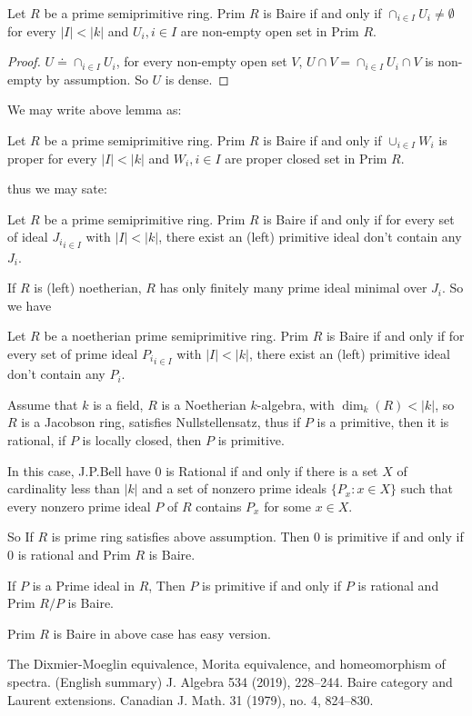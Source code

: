 \documentclass[12pt]{amsart}
\newcommand{\Prim}{ \text{Prim } }
\theoremstyle{plain}
\numberwithin{thm}{section}
\theoremstyle{definition}
\begin{document}
\lemma Let $R$ be a prime semiprimitive ring. $\Prim R$ is Baire if and only if $\cap_{i \in I} U_i \neq \emptyset$ for every $|I| < |k|$ and $U_i, i \in I$ are non-empty open set in $\Prim R$.

\begin{proof}
$U \doteq \cap_{i \in I} U_i$, for every non-empty open set $V$, $U \cap V = \cap_{i \in I}  {U_i} \cap V$ is non-empty by assumption. So $U$ is dense.
\end{proof}

We may write above lemma as:

\lemma Let $R$ be a prime semiprimitive ring. $\Prim R$ is Baire if and only if $\cup_{i \in I} W_i$ is proper for every $|I| < |k|$ and $W_i, i \in I$ are proper closed set in $\Prim R$.

thus we may sate:

\lemma Let $R$ be a prime semiprimitive ring. $\Prim R$ is Baire if and only if for every set of ideal ${J_i}_{i \in I}$ with $|I| < |k|$, there exist an (left) primitive ideal don't contain any $J_i$.

If $R$ is (left) noetherian, $R$ has only finitely many prime ideal minimal over $J_i$. So we have

\lemma Let $R$ be a noetherian prime semiprimitive ring. $\Prim R$ is Baire if and only if for every set of prime ideal ${P_i}_{i \in I}$ with $|I| < |k|$, there exist an (left) primitive ideal don't contain any $P_i$.

Assume that $k$ is a field, $R$ is a Noetherian $k$-algebra, with $\dim_k(R) < |k|$, so $R$ is a Jacobson ring, satisfies Nullstellensatz, thus if $P$ is a primitive, then it is rational, if $P$ is locally closed, then $P$ is primitive.

In this case, J.P.Bell have $0$ is Rational if and only if there is a set $X$ of cardinality less than $|k|$ and a set of nonzero prime ideals $\{P_x: x \in X\}$ such that every nonzero prime ideal $P$ of $R$ contains $P_x$ for some $x \in X$.

So If $R$ is prime ring satisfies above assumption. Then $0$ is primitive if and only if $0$ is rational and $\Prim R$ is Baire.

If $P$ is a Prime ideal in $R$, Then $P$ is primitive if and only if $P$ is rational and $\Prim R/P$ is Baire.

\remark $\Prim R$ is Baire in above case has easy version.


\begin{thebibliography}{2}  
 The Dixmier-Moeglin equivalence, Morita equivalence, and homeomorphism of spectra. (English summary)
J. Algebra 534 (2019), 228–244.
 Baire category and Laurent extensions.
Canadian J. Math. 31 (1979), no. 4, 824–830.
\end{thebibliography}
\
\end{document}
